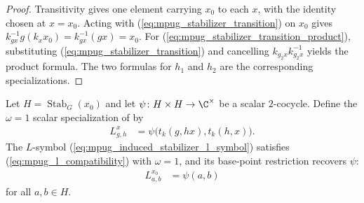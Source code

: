 \begin{proof}\leanok
    Transitivity gives one element carrying $x_0$ to each $x$, with the
    identity chosen at $x=x_0$. Acting with (\ref{eq:mpug_stabilizer_transition})
    on $x_0$ gives
    $k_{gx}^{-1}g(k_xx_0)=k_{gx}^{-1}(gx)=x_0$.
    For (\ref{eq:mpug_stabilizer_transition_product}), substituting
    (\ref{eq:mpug_stabilizer_transition}) and cancelling
    $k_{g_2x}k_{g_2x}^{-1}$ yields the product formula. The two formulas for
    $h_1$ and $h_2$ are the corresponding specializations.
\end{proof}

\begin{lemma}
    \label{thm:mpug_stabilizer_cocycle_l_symbol}
    \leanok
    Let $H=\operatorname{Stab}_G(x_0)$ and let
    $\psi\colon H\times H\to\C^\times$ be a scalar $2$-cocycle. Define the
    $\omega=1$ scalar specialization of \cite[Eq.~(20)]{GarreRubio2023MPOSym}
    by
    \begin{align}
        L^x_{g,h}
         & =\psi\bigl(t_k(g,hx),t_k(h,x)\bigr).
        \label{eq:mpug_induced_stabilizer_l_symbol}
    \end{align}
    The $L$-symbol (\ref{eq:mpug_induced_stabilizer_l_symbol}) satisfies
    (\ref{eq:mpug_l_compatibility}) with $\omega=1$, and its base-point
    restriction recovers $\psi$:
    \begin{align}
        L^{x_0}_{a,b} & =\psi(a,b)
        \label{eq:mpug_induced_stabilizer_base}
    \end{align}
    for all $a,b\in H$.


\end{lemma}
